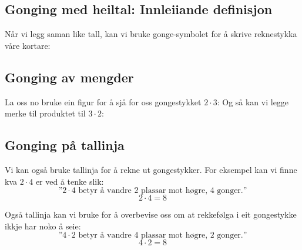 \subsection*{Gonging med heiltal: Innleiiande definisjon }
Når vi legg saman like tall, kan vi bruke gonge-symbolet \sym{$ \cdot $}\;for å skrive reknestykka våre kortare: \regv
{} \regv
{}
\newpage
\subsection*{Gonging av mengder}
La oss no bruke ein figur for å sjå for oss gongestykket $ 2\cdot3 $:
Og så kan vi legge merke til produktet til $ 3\cdot 2 $:
\reg[\gangkom \label{gangkom}]{
	Produktet er det same uansett rekkefølge på faktorane.
}

\subsection*{Gonging på tallinja}
Vi kan også bruke tallinja for å rekne ut gongestykker. For eksempel kan vi finne kva $ 2\cdot4 $ er ved å tenke slik:
\[\text{''} 2\cdot 4 \text{ betyr å vandre 2 plassar mot høgre, 4 gonger.}\text{''} \]
\[ 2\cdot4=8 \]

Også tallinja kan vi bruke for å overbevise oss om at rekkefølga i eit gongestykke ikkje har noko å seie:
\[\text{''} 4\cdot 2 \text{ betyr å vandre 4 plassar mot høgre, 2 gonger.}\text{''} \]
\[ 4\cdot2=8 \]


